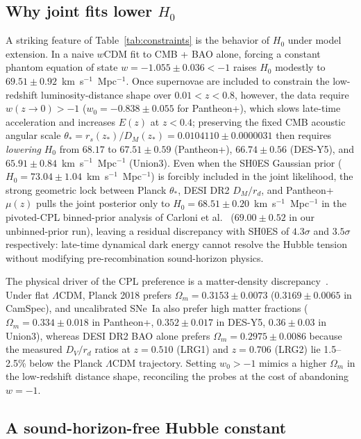\documentclass[aps,prd,preprint,superscriptaddress,nofootinbib]{revtex4-2}
\begin{document}
\subsection{Why joint fits lower $H_0$}

A striking feature of Table~\ref{tab:constraints} is the behavior of $H_0$ under model extension. In a naive $w$CDM fit to CMB + BAO alone, forcing a constant phantom equation of state $w = -1.055 \pm 0.036 < -1$ raises $H_0$ modestly to $69.51 \pm 0.92$~km~s$^{-1}$~Mpc$^{-1}$. Once supernovae are included to constrain the low-redshift luminosity-distance shape over $0.01 < z < 0.8$, however, the data require $w(z \to 0) > -1$ ($w_0 = -0.838 \pm 0.055$ for Pantheon+), which slows late-time acceleration and increases $E(z)$ at $z < 0.4$; preserving the fixed CMB acoustic angular scale $\theta_* = r_s(z_*)/D_M(z_*) = 0.0104110 \pm 0.0000031$ then requires \emph{lowering} $H_0$ from $68.17$ to $67.51 \pm 0.59$ (Pantheon+), $66.74 \pm 0.56$ (DES-Y5), and $65.91 \pm 0.84$~km~s$^{-1}$~Mpc$^{-1}$ (Union3). Even when the SH0ES Gaussian prior ($H_0 = 73.04 \pm 1.04$~km~s$^{-1}$~Mpc$^{-1}$) is forcibly included in the joint likelihood, the strong geometric lock between Planck $\theta_*$, DESI DR2 $D_M/r_d$, and Pantheon+ $\mu(z)$ pulls the joint posterior only to $H_0 = 68.51 \pm 0.20$~km~s$^{-1}$~Mpc$^{-1}$ in the pivoted-CPL binned-prior analysis of Carloni et al.~\cite{Carloni2026} ($69.00 \pm 0.52$ in our unbinned-prior run), leaving a residual discrepancy with SH0ES of $4.3\sigma$ and $3.5\sigma$ respectively: late-time dynamical dark energy cannot resolve the Hubble tension without modifying pre-recombination sound-horizon physics.

The physical driver of the CPL preference is a matter-density discrepancy~\cite{Zaldarriaga2026}. Under flat $\Lambda$CDM, Planck 2018 prefers $\Omega_m = 0.3153 \pm 0.0073$ ($0.3169 \pm 0.0065$ in CamSpec), and uncalibrated SNe~Ia also prefer high matter fractions ($\Omega_m = 0.334 \pm 0.018$ in Pantheon+, $0.352 \pm 0.017$ in DES-Y5, $0.36 \pm 0.03$ in Union3), whereas DESI DR2 BAO alone prefers $\Omega_m = 0.2975 \pm 0.0086$ because the measured $D_V/r_d$ ratios at $z = 0.510$ (LRG1) and $z = 0.706$ (LRG2) lie 1.5--2.5\% below the Planck $\Lambda$CDM trajectory. Setting $w_0 > -1$ mimics a higher $\Omega_m$ in the low-redshift distance shape, reconciling the probes at the cost of abandoning $w = -1$.

\subsection{A sound-horizon-free Hubble constant}
\end{document}
